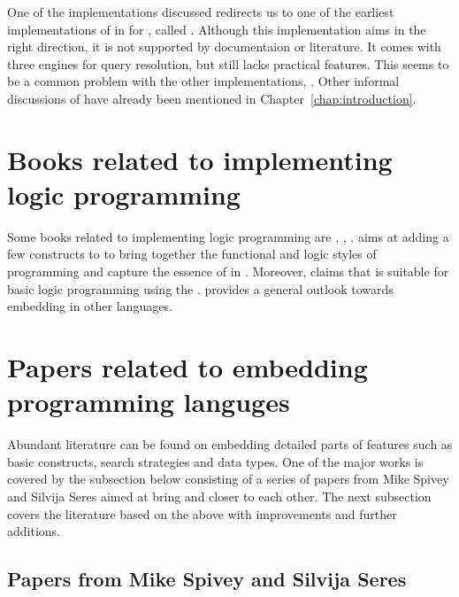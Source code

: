 \documentclass[thesis-solanki.tex]{subfiles}
\begin{document}
One of the implementations discussed redirects us to one of the earliest implementations of  in
 for , called  
\cite{website:mini-prolog-hugs98}.
Although this implementation aims in the right direction, it is not supported by documentaion or literature.
It comes with three engines for query resolution, but still lacks practical  features.
This seems to be a common problem with the other implementations, \cite{website:takashi-workplace}.
Other informal discussions of  have already been mentioned in Chapter~\ref{chap:introduction}.

\section{Books related to implementing logic programming}

Some books related to implementing logic programming are \cite{friedman05reasoned}, \cite{website:logicprogexamplehaskell}, 
\cite{krishnamurthi2007programming}. \cite{friedman05reasoned} aims at adding a few
constructs to  to bring together the functional and logic styles of programming and capture the essence of
 in . Moreover, \cite{website:logicprogexamplehaskell} claims that  is suitable for basic logic
programming using the .
\cite{krishnamurthi2007programming} provides a general outlook towards embedding  in other languages.

\section{Papers related to embedding programming languges}

Abundant literature can be found on embedding detailed parts of  features such as basic
constructs, search strategies and data types.
One of the major works is covered by the subsection below consisting of a series of papers from Mike Spivey and
Silvija Seres aimed at bring  and  closer to each other.
The next subsection covers the literature based on the above
with improvements and further additions.


\subsection{Papers from Mike Spivey and Silvija Seres}
\end{document}
